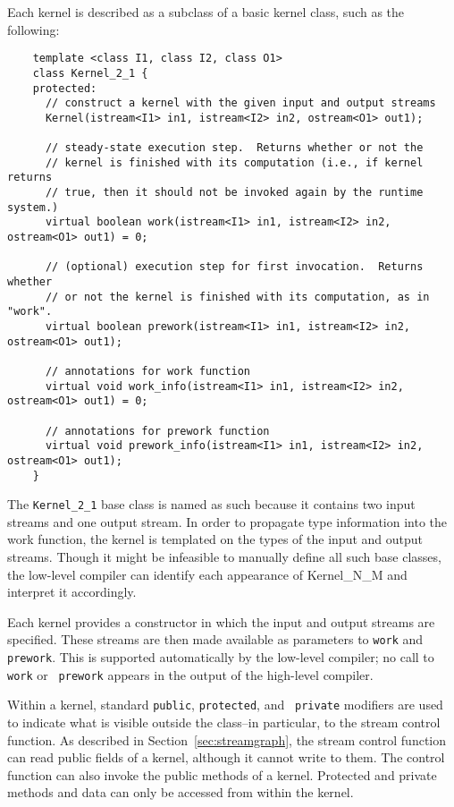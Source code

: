 Each kernel is described as a subclass of a basic kernel class, such
as the following:
{\small
\begin{verbatim}
    template <class I1, class I2, class O1>
    class Kernel_2_1 {
    protected:
      // construct a kernel with the given input and output streams
      Kernel(istream<I1> in1, istream<I2> in2, ostream<O1> out1);

      // steady-state execution step.  Returns whether or not the 
      // kernel is finished with its computation (i.e., if kernel returns
      // true, then it should not be invoked again by the runtime system.)
      virtual boolean work(istream<I1> in1, istream<I2> in2, ostream<O1> out1) = 0;

      // (optional) execution step for first invocation.  Returns whether 
      // or not the kernel is finished with its computation, as in "work".
      virtual boolean prework(istream<I1> in1, istream<I2> in2, ostream<O1> out1);

      // annotations for work function
      virtual void work_info(istream<I1> in1, istream<I2> in2, ostream<O1> out1) = 0;

      // annotations for prework function
      virtual void prework_info(istream<I1> in1, istream<I2> in2, ostream<O1> out1);
    }  
\end{verbatim}}

The {\tt Kernel\_2\_1} base class is named as such because it contains
two input streams and one output stream.  In order to propagate type
information into the work function, the kernel is templated on the
types of the input and output streams.  Though it might be infeasible
to manually define all such base classes, the low-level compiler can
identify each appearance of Kernel\_N\_M and interpret it accordingly.

Each kernel provides a constructor in which the input and output
streams are specified.  These streams are then made available as
parameters to {\tt work} and {\tt prework}.  This is supported
automatically by the low-level compiler; no call to {\tt work} or {\tt
prework} appears in the output of the high-level compiler.

Within a kernel, standard {\tt public}, {\tt protected}, and {\tt
private} modifiers are used to indicate what is visible outside the
class--in particular, to the stream control function.  As described in
Section~\ref{sec:streamgraph}, the stream control function can read
public fields of a kernel, although it cannot write to them.  The
control function can also invoke the public methods of a kernel.
Protected and private methods and data can only be accessed from
within the kernel.

